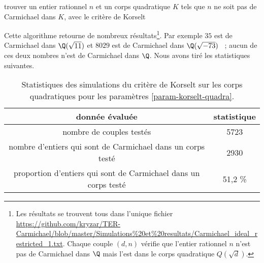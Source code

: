 \vspace{1em}
\begin{algorithm}[H]
\caption{trouver un entier rationnel $n$ et un corps quadratique $K$ tels que $n$ ne soit pas de Carmichael dans $K$, avec le critère de Korselt}
\end{algorithm}
\vspace{1em}

Cette algorithme retourne de nombreux résultats\footnote{Les résultats se trouvent tous dans l'unique fichier \url{https://github.com/kryzar/TER-Carmichael/blob/master/Simulations\%20et\%20resultats/Carmichael\_ideal\_restricted\_1.txt}. Chaque couple $(d, n)$ vérifie que l'entier rationnel $n$ n'est pas de Carmichael dans $\Q$ mais l'est dans le corps quadratique $Q(\sqrt{d})$.}. Par exemple $35$ est de Carmichael dans $\Q(\sqrt{11})$ et $8029$ est de Carmichael dans $\Q(\sqrt{-73})$ ~; aucun de ces deux nombres n'est de Carmichael dans $\Q$. Nous avons tiré les statistiques suivantes.

\begin{table}[H]
	\begin{center}
		\begin{tabular}{|c|c|}
			\hline
			donnée évaluée & statistique \\
			\hline
			\hline
			nombre de couples testés & 5723 \\\hline
			nombre d'entiers qui sont de Carmichael dans un corps testé & 2930 \\\hline
			proportion d'entiers qui sont de Carmichael dans un corps testé & 51,2 \% \\\hline
		\end{tabular}
		\caption{Statistiques des simulations du critère de Korselt sur les corps quadratiques pour les paramètres \ref{param-korselt-quadra}.}
	\end{center}
\end{table}

